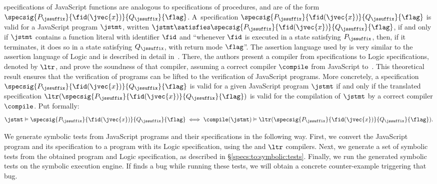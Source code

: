 \javert specifications of JavaScript functions are analogous to \jsil specifications of \jsil procedures, and are of the form $\specsig{P_{\jssuffix}}{\fid(\jvec{x})}{Q_{\jssuffix}}{\flag}$. A~\javert specification $\specsig{P_{\jssuffix}}{\fid(\jvec{x})}{Q_{\jssuffix}}{\flag}$
is valid for a JavaScript program $\jstmt$, written $\jstmt \satisfies \specsig{P_{\jssuffix}}{\fid(\jvec{x})}{Q_{\jssuffix}}{\flag}$, 
if and only if $\jstmt$ contains a function literal with identifier $\fid$ and ``whenever $\fid$ is executed in a state satisfying $P_\jssuffix$, then, 
if it terminates, it does so in a state satisfying $Q_\jssuffix$, with return mode $\flag$''. The assertion language used by \javert is very similar to the assertion language of \jsil Logic and is described in detail in~\cite{javert}.
There, the authors present 
a compiler from \javert specifications to \jsil Logic specifications, denoted by $\ltr$, and prove the soundness 
of that compiler, assuming a correct compiler $\compile$ from JavaScript to~\jsil.
This theoretical result ensures that the verification of \jsil programs can be lifted to   the verification of JavaScript programs. More concretely, a \javert  specification $\specsig{P_{\jssuffix}}{\fid(\jvec{x})}{Q_{\jssuffix}}{\flag}$
is valid for a given JavaScript program $\jstmt$ if and only if the translated specification 
$\ltr(\specsig{P_{\jssuffix}}{\fid(\jvec{x})}{Q_{\jssuffix}}{\flag})$ is valid for the compilation 
of $\jstmt$ by a correct compiler $\compile$. Put formally:  
\begin{equation}
   \jstmt \vDash  \specsig{P_{\jssuffix}}{\fid(\jvec{x})}{Q_{\jssuffix}}{\flag} 
      \iff
           \compile(\jstmt) \vDash \ltr(\specsig{P_{\jssuffix}}{\fid(\jvec{x})}{Q_{\jssuffix}}{\flag}).
\end{equation}

We generate symbolic tests from JavaScript programs and their \javert specifications in the following way. First, we convert the JavaScript program and its \javert specification to a \jsil program with its \jsil Logic specification, using the \JSComp and $\ltr$ compilers. Next, we 
generate a set of symbolic tests from the obtained \jsil program and \jsil Logic specification, as described in \S\ref{specs:to:symbolic:tests}. 
Finally, we run the generated \jsil symbolic tests on the \jsil symbolic execution engine. If \cosette finds a bug while running these tests, we will obtain a concrete counter-example triggering that bug.

